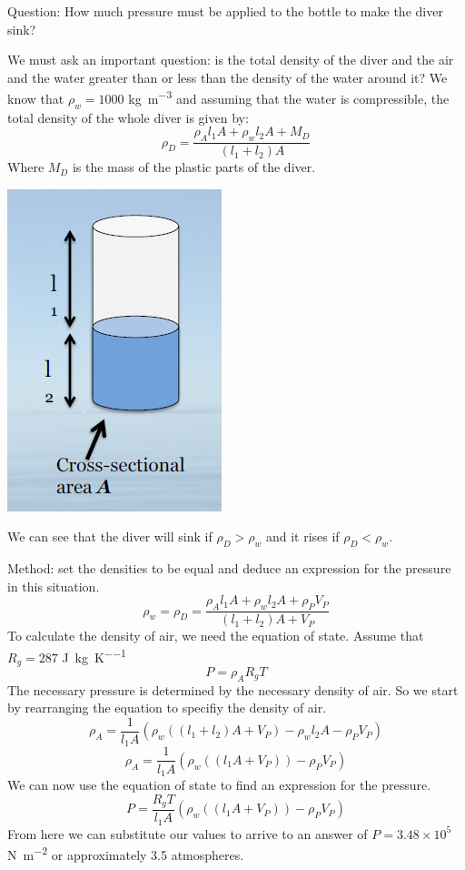 \documentclass[class=report, crop=false, 12pt,a4paper]{standalone}
\begin{document}
Question: How much pressure must be applied to the bottle to make the diver sink?

We must ask an important question: is the total density of the diver and the air and the water greater than or less than the density of the water around it? We know that \( \rho_w = 1000\) \si{kg\per\meter\cubed} and assuming that the water is compressible, the total density of the whole diver is given by:
\[ \rho_D = \frac{\rho_A l_1 A + \rho_w l_2 A + M_D}{(l_1 + l_2)A} \]
Where \(M_D\) is the mass of the plastic parts of the diver. 
\begin{center}
  \includegraphics[width = 0.4 \textwidth]{../img/CartesianDiver}
\end{center}
We can see that the diver will sink if \(\rho_D > \rho_w\) and it rises if \(\rho_D < \rho_w\).

Method: set the densities to be equal and deduce an expression for the pressure in this situation. 
\[ \rho_w = \rho_D = \frac{\rho_A l_1 A + \rho_w l_2 A + \rho_P V_P}{(l_1 + l_2)A + V_P} \]
To calculate the density of air, we need the equation of state. Assume that \( R_g = 287\) \si{\joule\per\kg\per\kelvin}
\[ P = \rho_A R_g T\]
The necessary pressure is determined by the necessary density of air. So we start by rearranging the equation to specifiy the density of air. 
\[ \rho_A = \frac{1}{l_1 A} \left( \rho_w \left( (l_1 + l_2)A + V_P \right) - \rho_w l_2 A - \rho_P V_P \right)\]
\[ \rho_A = \frac{1}{l_1 A} \left( \rho_w \left( (l_1A + V_P) \right) -\rho_P V_P \right) \]
We can now use the equation of state to find an expression for the pressure. 
\[ P = \frac{R_g T}{l_1 A} \left( \rho_w \left( (l_1A + V_P) \right) -\rho_P V_P \right) \]
From here we can substitute our values to arrive to an answer of \( P = 3.48 \times 10^5\) \si{\newton\per\meter\squared} or approximately 3.5 atmospheres. 
\end{document}
